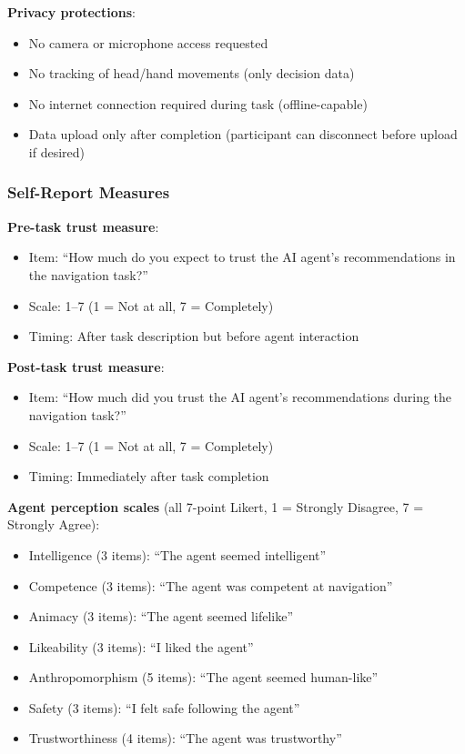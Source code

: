 \documentclass[12pt]{article}
\begin{document}
\textbf{Privacy protections}:
\begin{itemize}
    \item No camera or microphone access requested
    \item No tracking of head/hand movements (only decision data)
    \item No internet connection required during task (offline-capable)
    \item Data upload only after completion (participant can disconnect before upload if desired)
\end{itemize}

\subsubsection{Self-Report Measures}

\textbf{Pre-task trust measure}:
\begin{itemize}
    \item Item: ``How much do you expect to trust the AI agent's recommendations in the navigation task?''
    \item Scale: 1--7 (1 = Not at all, 7 = Completely)
    \item Timing: After task description but before agent interaction
\end{itemize}

\textbf{Post-task trust measure}:
\begin{itemize}
    \item Item: ``How much did you trust the AI agent's recommendations during the navigation task?''
    \item Scale: 1--7 (1 = Not at all, 7 = Completely)
    \item Timing: Immediately after task completion
\end{itemize}

\textbf{Agent perception scales} (all 7-point Likert, 1 = Strongly Disagree, 7 = Strongly Agree):
\begin{itemize}
    \item Intelligence (3 items): ``The agent seemed intelligent''
    \item Competence (3 items): ``The agent was competent at navigation''
    \item Animacy (3 items): ``The agent seemed lifelike''
    \item Likeability (3 items): ``I liked the agent''
    \item Anthropomorphism (5 items): ``The agent seemed human-like''
    \item Safety (3 items): ``I felt safe following the agent''
    \item Trustworthiness (4 items): ``The agent was trustworthy''
\end{itemize}
\end{document}
